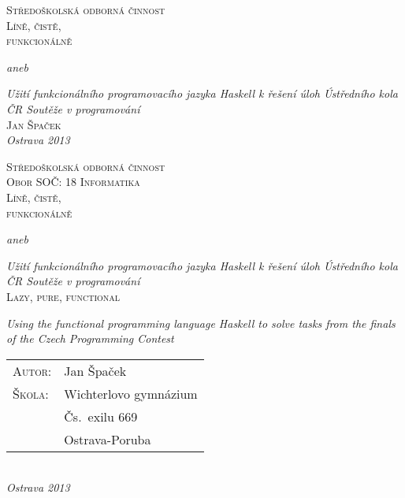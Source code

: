 
\begin{titlepage}
\begin{center}

\textsc{\LARGE Středoškolská odborná činnost}\\[4cm]

\textsc{\Huge Líně, čistě,\\ funkcionálně}

\textit{\large aneb}

\textit{\LARGE Užití funkcionálního programovacího jazyka Haskell k řešení
úloh Ústředního kola ČR Soutěže v programování}\\[2cm]

\textsc{\huge Jan Špaček}\\[10cm]

\textit{\LARGE Ostrava 2013}

\end{center}
\end{titlepage}

\thispagestyle{empty}
\cleardoublepage


\begin{center}

\textsc{\LARGE Středoškolská odborná činnost}\\[0.6cm]
\textsc{\large Obor SOČ: 18 Informatika}\\[2cm]

\textsc{\Huge Líně, čistě,\\ funkcionálně}

\textit{\large aneb}

\textit{\LARGE Užití funkcionálního programovacího jazyka Haskell k řešení
úloh Ústředního kola ČR Soutěže v programování}\\[2cm]

\textsc{\huge Lazy, pure, functional}

\textit{\Large Using the functional programming language Haskell to solve
tasks from the finals of the Czech Programming Contest}\\[3cm]

\begin{tabularx}{12cm}{
  >{\Large\scshape}p{3cm} 
  >{\LARGE}X 
}
Autor:    & Jan Špaček \\[0.5cm]
Škola:    & Wichterlovo gymnázium \\[0.15cm]
          & Čs.~exilu 669 \\[0.2cm]
          & Ostrava-Poruba \\
\end{tabularx}
\\[3cm]

\textit{\LARGE Ostrava 2013}

\end{center}

